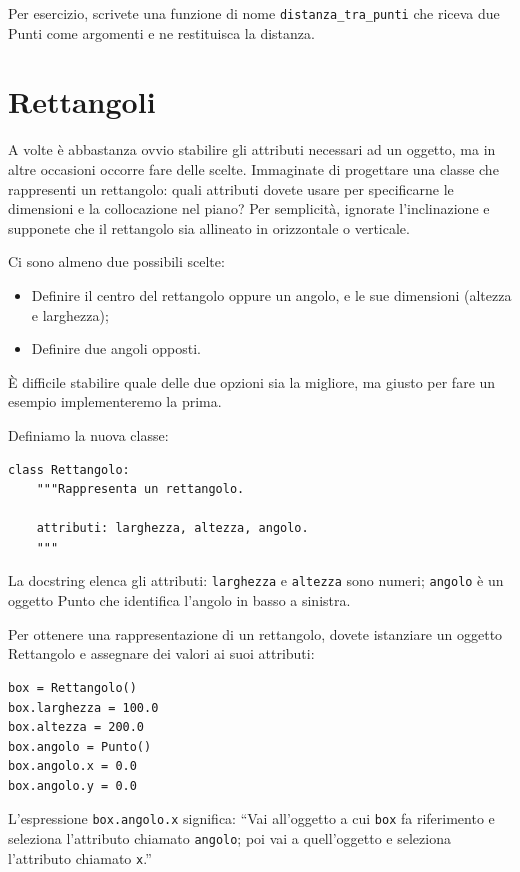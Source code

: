 \documentclass[10pt]{book}
\begin{document}
Per esercizio, scrivete una funzione di nome \verb"distanza_tra_punti" che riceva due Punti come argomenti e ne restituisca la distanza.


\section{Rettangoli}
\label{rectangles}

A volte è abbastanza ovvio stabilire gli attributi necessari ad un oggetto, ma in altre occasioni occorre fare delle scelte. Immaginate di progettare una classe che rappresenti un rettangolo: quali attributi dovete usare per specificarne le dimensioni e la collocazione nel piano? Per semplicità, ignorate l'inclinazione e supponete che il rettangolo sia allineato in orizzontale o verticale.

Ci sono almeno due possibili scelte: 

\begin{itemize}

\item Definire il centro del rettangolo oppure un angolo, e le sue dimensioni (altezza e larghezza);

\item Definire due angoli opposti.

\end{itemize}

È difficile stabilire quale delle due opzioni sia la migliore, ma giusto per fare un esempio implementeremo la prima.

Definiamo la nuova classe:

\begin{verbatim}
class Rettangolo:
    """Rappresenta un rettangolo. 

    attributi: larghezza, altezza, angolo.
    """
\end{verbatim}
%
La docstring elenca gli attributi:  {\tt larghezza} e
{\tt altezza} sono numeri; {\tt angolo} è un oggetto Punto che identifica l'angolo in basso a sinistra.

Per ottenere una rappresentazione di un rettangolo, dovete istanziare un oggetto Rettangolo e assegnare dei valori ai suoi attributi:

\begin{verbatim}
box = Rettangolo()
box.larghezza = 100.0
box.altezza = 200.0
box.angolo = Punto()
box.angolo.x = 0.0
box.angolo.y = 0.0
\end{verbatim}
%
L'espressione {\tt box.angolo.x} significa:
``Vai all'oggetto a cui {\tt box} fa riferimento e seleziona l'attributo chiamato
{\tt angolo}; poi vai a quell'oggetto e seleziona l'attributo chiamato {\tt x}.''
\end{document}
